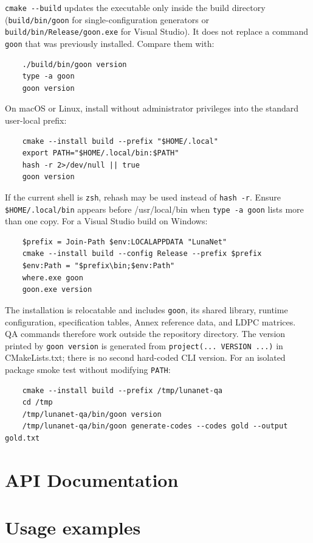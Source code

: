 \documentclass{article}
\begin{document}
\verb|cmake --build| updates the executable only inside the build directory (\verb|build/bin/goon| for single-configuration generators or \verb|build/bin/Release/goon.exe| for Visual Studio). It does not replace a command \verb|goon| that was previously installed. Compare them with:
\begin{verbatim}
    ./build/bin/goon version
    type -a goon
    goon version
\end{verbatim}
On macOS or Linux, install without administrator privileges into the standard user-local prefix:
\begin{verbatim}
    cmake --install build --prefix "$HOME/.local"
    export PATH="$HOME/.local/bin:$PATH"
    hash -r 2>/dev/null || true
    goon version
\end{verbatim}
If the current shell is \verb|zsh|, rehash may be used instead of \verb|hash -r|. Ensure \verb|$HOME/.local/bin| appears before /usr/local/bin when \verb|type -a goon| lists more than one copy.
For a Visual Studio build on Windows:
\begin{verbatim}
    $prefix = Join-Path $env:LOCALAPPDATA "LunaNet"
    cmake --install build --config Release --prefix $prefix
    $env:Path = "$prefix\bin;$env:Path"
    where.exe goon
    goon.exe version
\end{verbatim}
The installation is relocatable and includes \verb|goon|, its shared library, runtime configuration, specification tables, Annex reference data, and LDPC matrices. QA commands therefore work outside the repository directory. The version printed by \verb|goon version| is generated from \verb|project(... VERSION ...)| in CMakeLists.txt; there is no second hard-coded CLI version.
For an isolated package smoke test without modifying \verb|PATH|:
\begin{verbatim}
    cmake --install build --prefix /tmp/lunanet-qa
    cd /tmp
    /tmp/lunanet-qa/bin/goon version
    /tmp/lunanet-qa/bin/goon generate-codes --codes gold --output gold.txt
\end{verbatim}

\newpage

\section{API Documentation}

\newpage

\section{Usage examples}
\end{document}
